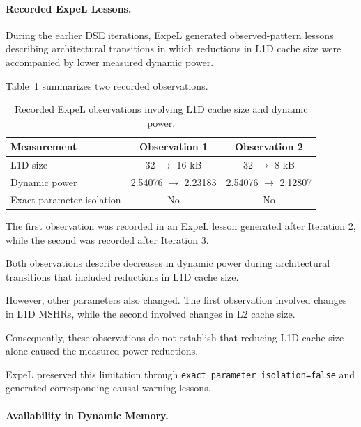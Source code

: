 \paragraph{Recorded ExpeL Lessons.}

During the earlier DSE iterations, ExpeL generated
observed-pattern lessons describing architectural
transitions in which reductions in L1D cache size
were accompanied by lower measured dynamic power.

Table~\ref{tab:app_v2_positive_expel}
summarizes two recorded observations.

\begin{table}[htbp]
\centering
\caption{Recorded ExpeL observations involving
L1D cache size and dynamic power.}
\label{tab:app_v2_positive_expel}
\renewcommand{\arraystretch}{1.15}
\small
\begin{tabular}{lcc}
\toprule
\textbf{Measurement} &
\textbf{Observation 1} &
\textbf{Observation 2} \\
\midrule
L1D size &
32 $\rightarrow$ 16 kB &
32 $\rightarrow$ 8 kB \\

Dynamic power &
2.54076 $\rightarrow$ 2.23183 &
2.54076 $\rightarrow$ 2.12807 \\

Exact parameter isolation &
No & No \\
\bottomrule
\end{tabular}
\end{table}

The first observation was recorded in an
ExpeL lesson generated after Iteration 2,
while the second was recorded after Iteration 3.

Both observations describe decreases in
dynamic power during architectural transitions
that included reductions in L1D cache size.

However, other parameters also changed.
The first observation involved changes in
L1D MSHRs, while the second involved changes
in L2 cache size.

Consequently, these observations do not
establish that reducing L1D cache size alone
caused the measured power reductions.

ExpeL preserved this limitation through
\texttt{exact\_parameter\_isolation=false}
and generated corresponding causal-warning
lessons.

\paragraph{Availability in Dynamic Memory.}

